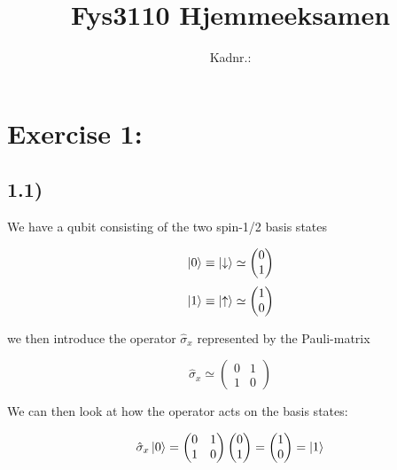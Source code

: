 \documentclass[a4paper,norsk, 10pt]{article}
\title{Fys3110 Hjemmeeksamen}
\author{Kadnr.: }
\begin{document}
\maketitle

\section{Exercise 1:}

\subsection{1.1)}\label{sec:11}
We have a qubit consisting of the two spin-1/2 basis states

\begin{equation}
\ket{0} \equiv \ket{\downarrow} \simeq 
\begin{pmatrix}
0 \\ 1
\end{pmatrix}
\end{equation}
\begin{equation}
\ket{1} \equiv \ket{\uparrow} \simeq 
\begin{pmatrix}
1 \\ 0
\end{pmatrix}
\end{equation}

we then introduce the operator $\hat{\sigma}_x$ represented by the Pauli-matrix

\begin{equation}
\hat{\sigma}_x \simeq
\begin{pmatrix}
0 & 1\\
1 & 0
\end{pmatrix}
\end{equation}

We can then look at how the operator acts on the basis states:

\begin{equation}
\hat{\sigma}_x\ket{0} = 
\begin{pmatrix}
0 & 1\\
1 & 0
\end{pmatrix}
\begin{pmatrix}
0 \\ 1
\end{pmatrix} = 
\begin{pmatrix}
1 \\ 0
\end{pmatrix} = \ket{1}
\end{equation}
\end{document}
